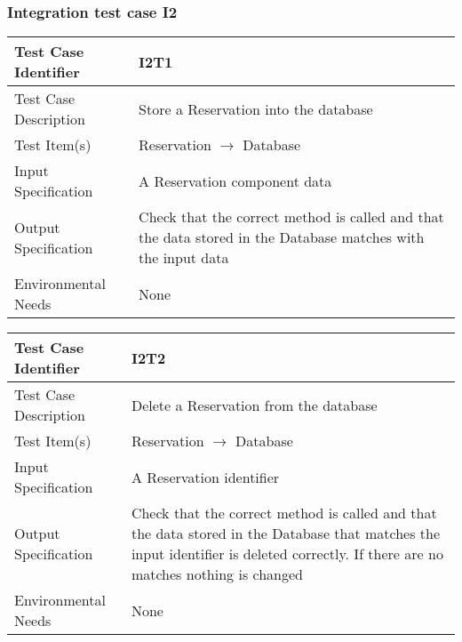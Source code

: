 		\subsubsection{Integration test case I2}
		\begin{center}
			\begin{tabular}{ |l p{10cm}| } \hline
				Test Case Identifier & I2T1 \\ \hline
				Test Case Description & Store a Reservation into the database \\ \hline
				Test Item(s) & Reservation $\rightarrow$ Database \\ \hline
				Input Specification & A Reservation component data \\ \hline
				Output Specification & Check that the correct method is called and that the data stored in the Database 
				matches with the input data \\ \hline
				Environmental Needs & None \\ \hline
			\end{tabular}
			\begin{tabular}{ |l p{10cm}| } \hline
				Test Case Identifier & I2T2 \\ \hline
				Test Case Description & Delete a Reservation from the database \\ \hline
				Test Item(s) & Reservation $\rightarrow$ Database \\ \hline
				Input Specification & A Reservation identifier \\ \hline
				Output Specification & Check that the correct method is called and that the data stored in the Database 
				that matches the input identifier is deleted correctly. If there are no matches nothing is changed \\ \hline
				Environmental Needs & None \\ \hline
			\end{tabular}
		\end{center}
